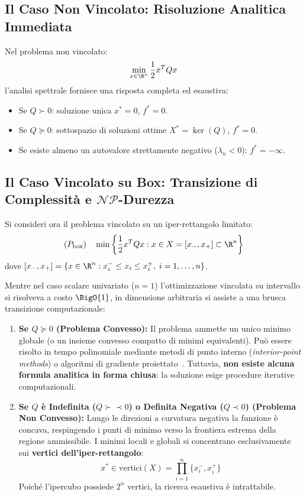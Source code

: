 \subsection{Il Caso Non Vincolato: Risoluzione Analitica Immediata}
Nel problema non vincolato:
\begin{equation}
\min_{x \in \R^n} \frac{1}{2} x^T Q x
\end{equation}
l'analisi spettrale fornisce una risposta completa ed esaustiva:
\begin{itemize}
    \item Se $Q \succ 0$: soluzione unica $x^* = 0$, $f^* = 0$.
    \item Se $Q \succeq 0$: sottospazio di soluzioni ottime $X^* = \ker(Q)$, $f^* = 0$.
    \item Se esiste almeno un autovalore strettamente negativo ($\lambda_n < 0$): $f^* = -\infty$.
\end{itemize}

\subsection{Il Caso Vincolato su Box: Transizione di Complessit\`a e \texorpdfstring{$\mathcal{NP}$}{NP}-Durezza}
Si consideri ora il problema vincolato su un iper-rettangolo limitato:
\begin{equation}
(P_{\text{box}}) \quad \min \left\{ \frac{1}{2} x^T Q x : x \in X = [x_-, x_+] \subset \R^n \right\}
\end{equation}
dove $[x_-, x_+] = \{x \in \R^n : x_i^- \le x_i \le x_i^+, \; i = 1, \dots, n\}$.

Mentre nel caso scalare univariato ($n = 1$) l'ottimizzazione vincolata su intervallo si risolveva a costo $\BigO{1}$, in dimensione arbitraria si assiste a una brusca transizione computazionale:

\begin{enumerate}
    \item \textbf{Se $Q \succeq 0$ (Problema Convesso):}
    Il problema ammette un unico minimo globale (o un insieme convesso compatto di minimi equivalenti). Pu\`o essere risolto in tempo polinomiale mediante metodi di punto interno (\textit{interior-point methods}) o algoritmi di gradiente proiettato~\cite{boyd2004convex, nocedal2006numerical}. Tuttavia, \textbf{non esiste alcuna formula analitica in forma chiusa}: la soluzione esige procedure iterative computazionali.
    
    \item \textbf{Se $Q$ \`e Indefinita ($Q \succ\prec 0$) o Definita Negativa ($Q \prec 0$) (Problema Non Convesso):}
    Lungo le direzioni a curvatura negativa la funzione \`e concava, respingendo i punti di minimo verso la frontiera estrema della regione ammissibile. I minimi locali e globali si concentrano esclusivamente sui \textbf{vertici dell'iper-rettangolo}:
    \begin{equation}
    x^* \in \text{vertici}(X) = \prod_{i=1}^n \{x_i^-, x_i^+\}
    \end{equation}
    Poich\'e l'ipercubo possiede $2^n$ vertici, la ricerca esaustiva \`e intrattabile.
\end{enumerate}

